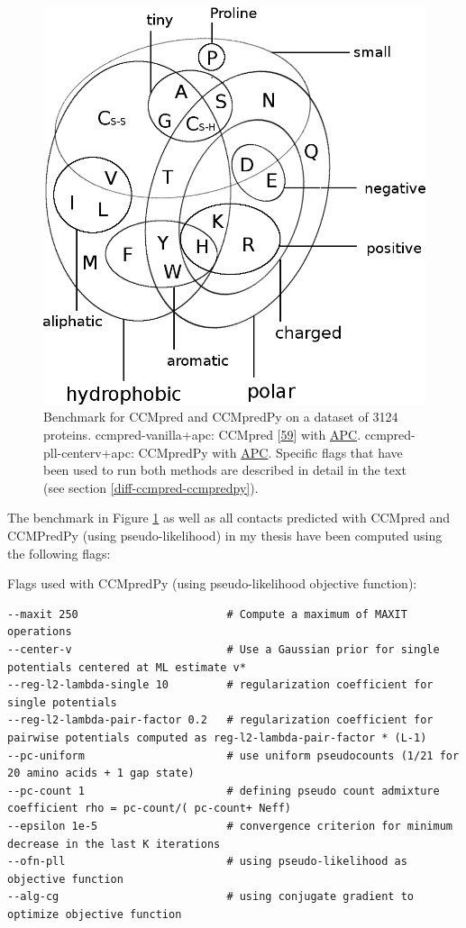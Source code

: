 \documentclass[12pt,a4paper,twoside]{book}
\theoremstyle{definition}
\theoremstyle{definition}
\theoremstyle{remark}
\begin{document}
\begin{figure}
\includegraphics[width=1\linewidth]{img/amino_acid_physico_chemical_properties_venn_diagramm} \caption{Benchmark for CCMpred and
CCMpredPy on a dataset of 3124 proteins. ccmpred-vanilla+apc: CCMpred
{[}\protect\hyperlink{ref-Seemayer2014}{59}{]} with
\protect\hyperlink{abbrev}{APC}. ccmpred-pll-centerv+apc: CCMpredPy with
\protect\hyperlink{abbrev}{APC}. Specific flags that have been used to
run both methods are described in detail in the text (see section
\ref{diff-ccmpred-ccmpredpy}).}\label{fig:cmmpredvanilla-vs-ccmpredpy}
\end{figure}

The benchmark in Figure \ref{fig:cmmpredvanilla-vs-ccmpredpy} as well as
all contacts predicted with CCMpred and CCMPredPy (using
pseudo-likelihood) in my thesis have been computed using the following
flags:

Flags used with CCMpredPy (using pseudo-likelihood objective function):

\begin{verbatim}
--maxit 250                       # Compute a maximum of MAXIT operations
--center-v                        # Use a Gaussian prior for single potentials centered at ML estimate v*
--reg-l2-lambda-single 10         # regularization coefficient for single potentials
--reg-l2-lambda-pair-factor 0.2   # regularization coefficient for pairwise potentials computed as reg-l2-lambda-pair-factor * (L-1)
--pc-uniform                      # use uniform pseudocounts (1/21 for 20 amino acids + 1 gap state) 
--pc-count 1                      # defining pseudo count admixture coefficient rho = pc-count/( pc-count+ Neff)
--epsilon 1e-5                    # convergence criterion for minimum decrease in the last K iterations
--ofn-pll                         # using pseudo-likelihood as objective function
--alg-cg                          # using conjugate gradient to optimize objective function
\end{verbatim}
\end{document}
